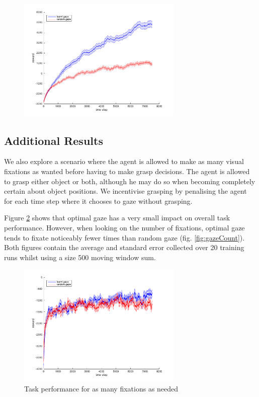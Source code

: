\documentclass[11]{article}
\begin{document}
\begin{figure}[h]
	\centering
	\includegraphics[width=0.7\textwidth]{results.png}
	\caption{}
	\label{fig:results}
\end{figure}

\subsection{Additional Results}
We also explore a scenario where the agent is allowed to make as many visual fixations as wanted before having to make grasp decisions. The agent is allowed to grasp either object or both, although he may do so when becoming completely certain about object positions. We incentivise grasping by penalising the agent for each time step where it chooses to gaze without grasping.

Figure \ref{fig:resultsTimless} shows that optimal gaze has a very small impact on overall task performance. However, when looking on the number of fixations, optimal gaze tends to fixate noticeably fewer times than random gaze (fig. \ref{fig:gazeCount}). Both figures contain the average and standard error collected over 20 training runs whilst using a size 500 moving window sum.

\begin{figure}[h]
	\centering
	\includegraphics[width=0.7\textwidth]{resultsTimeless.png}
	\caption{Task performance for as many fixations as needed}
	\label{fig:resultsTimless}
\end{figure}
\end{document}
